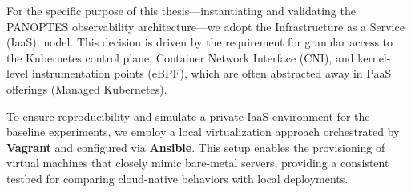 For the specific purpose of this thesis—instantiating and validating the PANOPTES observability architecture—we adopt the Infrastructure as a Service (IaaS) model. This decision is driven by the requirement for granular access to the Kubernetes control plane, Container Network Interface (CNI), and kernel-level instrumentation points (eBPF), which are often abstracted away in PaaS offerings (Managed Kubernetes).

To ensure reproducibility and simulate a private IaaS environment for the baseline experiments, we employ a local virtualization approach orchestrated by \textbf{Vagrant} and configured via \textbf{Ansible}. This setup enables the provisioning of virtual machines that closely mimic bare-metal servers, providing a consistent testbed for comparing cloud-native behaviors with local deployments.